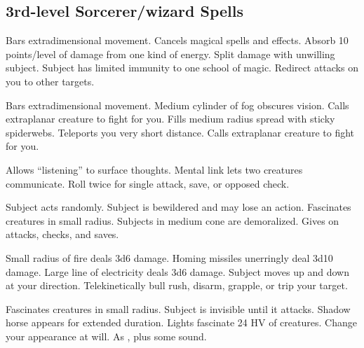 \subsection{3rd-level Sorcerer/wizard Spells} 
\begin{swspelllist}
   Bars extradimensional movement.
   Cancels magical spells and effects.
   Absorb 10 points/level of damage from one kind of energy.
   Split damage with unwilling subject.
   Subject has limited immunity to one school of magic. 
  \spellheadrestricted{}
   Redirect attacks on you to other targets.

   Bars extradimensional movement.
   Medium cylinder of fog obscures vision.
   Calls extraplanar creature to fight for you.
   Fills medium radius spread with sticky spiderwebs.
   Teleports you very short distance.
   Calls extraplanar creature to fight for you.

   Allows ``listening'' to surface thoughts.
   Mental link lets two creatures communicate.
   Roll twice for single attack, save, or opposed check.
  \spellheadrestricted{}

   Subject acts randomly.
   Subject is bewildered and may lose an action.
   Fascinates creatures in small radius.
   Subjects in medium cone are demoralized.
   Gives  on attacks, checks, and saves.

   Small radius of fire deals 3d6 damage.
   Homing missiles unerringly deal 3d10 damage.
   Large line of electricity deals 3d6 damage.
   Subject moves up and down at your direction.
   Telekinetically bull rush, disarm, grapple, or trip your target.

   Fascinates creatures in small radius.
   Subject is invisible until it attacks.
   Shadow horse appears for extended duration.
   Lights fascinate 24 HV of creatures.
   Change your appearance at will.
   As , plus some sound.


\end{swspelllist}
